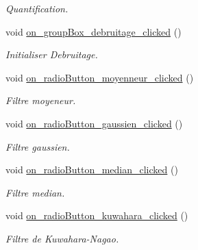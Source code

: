 \begin{DoxyCompactItemize}
\begin{DoxyCompactList}\small\item\em Quantification. \end{DoxyCompactList}\item 
\mbox{\label{classMainWindow_a841611a6fb40370ae0d321e479e761eb}} 
void \hyperlink{classMainWindow_a841611a6fb40370ae0d321e479e761eb}{on\+\_\+group\+Box\+\_\+debruitage\+\_\+clicked} ()
\begin{DoxyCompactList}\small\item\em Initialiser Debruitage. \end{DoxyCompactList}\item 
\mbox{\label{classMainWindow_aad60cb1c0c65e4bcd627c82b79c60841}} 
void \hyperlink{classMainWindow_aad60cb1c0c65e4bcd627c82b79c60841}{on\+\_\+radio\+Button\+\_\+moyenneur\+\_\+clicked} ()
\begin{DoxyCompactList}\small\item\em Filtre moyeneur. \end{DoxyCompactList}\item 
\mbox{\label{classMainWindow_a73757dee3a85b6fe6c81bb543c8c15e9}} 
void \hyperlink{classMainWindow_a73757dee3a85b6fe6c81bb543c8c15e9}{on\+\_\+radio\+Button\+\_\+gaussien\+\_\+clicked} ()
\begin{DoxyCompactList}\small\item\em Filtre gaussien. \end{DoxyCompactList}\item 
\mbox{\label{classMainWindow_a0232e17dff3e5531a8ec8b5f93766a87}} 
void \hyperlink{classMainWindow_a0232e17dff3e5531a8ec8b5f93766a87}{on\+\_\+radio\+Button\+\_\+median\+\_\+clicked} ()
\begin{DoxyCompactList}\small\item\em Filtre median. \end{DoxyCompactList}\item 
\mbox{\label{classMainWindow_a613137e99b4e04a8aa4143f1daa2286a}} 
void \hyperlink{classMainWindow_a613137e99b4e04a8aa4143f1daa2286a}{on\+\_\+radio\+Button\+\_\+kuwahara\+\_\+clicked} ()
\begin{DoxyCompactList}\small\item\em Filtre de Kuwahara-\/\+Nagao. \end{DoxyCompactList}\item 

\end{DoxyCompactItemize}
